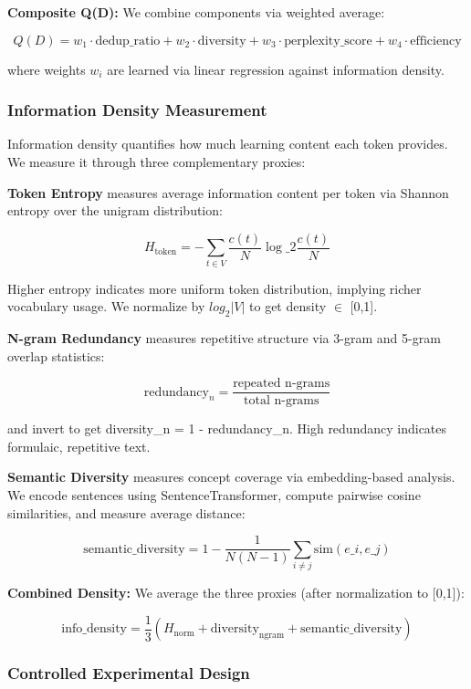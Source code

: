 \textbf{Composite Q(D):} We combine components via weighted average:

$$
Q(D) = w_1 \cdot \text{dedup\_ratio} + w_2 \cdot \text{diversity} + w_3 \cdot \text{perplexity\_score} + w_4 \cdot \text{efficiency}
$$

where weights $w_i$ are learned via linear regression against information density.

\subsubsection{Information Density Measurement}

Information density quantifies how much learning content each token provides. We measure it through three complementary proxies:

\textbf{Token Entropy} measures average information content per token via Shannon entropy over the unigram distribution:

$$
H_{\text{token}} = -\sum_{t \in V} \frac{c(t)}{N} \log\_2 \frac{c(t)}{N}
$$

Higher entropy indicates more uniform token distribution, implying richer vocabulary usage. We normalize by $log_{2}|V|$ to get density $\in$ [0,1].

\textbf{N-gram Redundancy} measures repetitive structure via 3-gram and 5-gram overlap statistics:

$$
\text{redundancy}_n = \frac{\text{repeated n-grams}}{\text{total n-grams}}
$$

and invert to get diversity\_n = 1 - redundancy\_n. High redundancy indicates formulaic, repetitive text.

\textbf{Semantic Diversity} measures concept coverage via embedding-based analysis. We encode sentences using SentenceTransformer, compute pairwise cosine similarities, and measure average distance:

$$
\text{semantic\_diversity} = 1 - \frac{1}{N(N-1)} \sum_{i \neq j} \text{sim}(e\_i, e\_j)
$$

\textbf{Combined Density:} We average the three proxies (after normalization to [0,1]):

$$
\text{info\_density} = \frac{1}{3}(H_{\text{norm}} + \text{diversity}_{\text{ngram}} + \text{semantic\_diversity})
$$

\subsubsection{Controlled Experimental Design}

